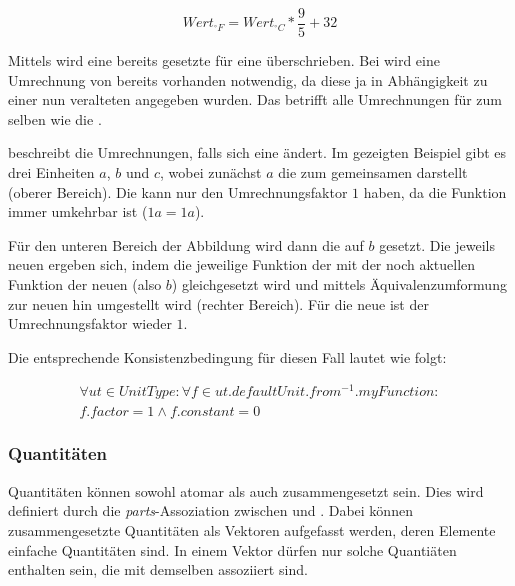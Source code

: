 \[Wert_{^\circ F} = Wert_{^\circ C} * \frac{9}{5} + 32\]

Mittels  wird eine bereits gesetzte  für eine  überschrieben.
Bei  wird eine Umrechnung von bereits vorhanden  notwendig, da diese ja in Abhängigkeit zu einer nun veralteten  angegeben wurden. Das betrifft alle Umrechnungen für  zum selben  wie die .

 beschreibt die Umrechnungen, falls sich eine  ändert.
Im gezeigten Beispiel gibt es drei Einheiten $a$, $b$ und $c$, wobei zunächst $a$ die  zum gemeinsamen  darstellt (oberer Bereich). Die  kann nur den Umrechnungsfaktor $1$ haben, da die Funktion immer umkehrbar ist ($1a=1a$). 

Für den unteren Bereich der Abbildung wird dann die  auf $b$ gesetzt. Die jeweils neuen  ergeben sich, indem die jeweilige Funktion der  mit der noch aktuellen Funktion der neuen  (also $b$) gleichgesetzt wird und mittels Äquivalenzumformung zur neuen  hin umgestellt wird (rechter Bereich). Für die neue  ist der Umrechnungsfaktor wieder $1$.

Die entsprechende Konsistenzbedingung für diesen Fall lautet wie folgt:

\begin{equation} 
\begin{split}
\forall ut \in UnitType : \forall f \in ut.defaultUnit.from^{-1}.myFunction: \\
f.factor = 1 \wedge f.constant = 0 
\end{split}
\end{equation} 

\subsubsection{Quantitäten}\label{Quantitaeten}


Quantitäten können sowohl atomar als auch zusammengesetzt sein.
Dies wird definiert durch die \textit{parts}-Assoziation zwischen  und . 
Dabei können zusammengesetzte Quantitäten als Vektoren aufgefasst werden, deren Elemente einfache Quantitäten sind. 
In einem Vektor dürfen nur solche Quantiäten enthalten sein, die mit demselben  assoziiert sind. 

